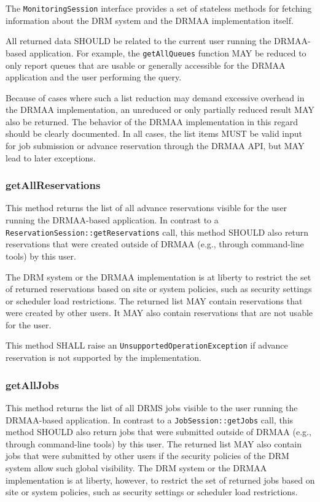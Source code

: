 \documentclass{article}
\newcommand{\h}[1]{\lstinline|#1|}
\begin{document}
The \h{MonitoringSession} interface provides a set of stateless methods for fetching information about the DRM system and the DRMAA implementation itself.



All returned data SHOULD be related to the current user running the DRMAA-based application. For example, the \h{getAllQueues} function MAY be reduced to only report queues that are usable or generally accessible for the DRMAA application and the user performing the query. 

Because of cases where such a list reduction may demand excessive overhead in the DRMAA implementation, an unreduced or only partially reduced result MAY also be returned. The behavior of the DRMAA implementation in this regard should be clearly documented. In all cases, the list items MUST be valid input for job submission or advance reservation through the DRMAA API, but MAY lead to later exceptions.

\subsubsection{getAllReservations}
\label{sec:getallreservations}

This method returns the list of all advance reservations visible for the user running the DRMAA-based application. In contrast to a \h{ReservationSession::getReservations} call, this method SHOULD also return reservations that were created outside of DRMAA (e.g., through command-line tools) by this user. 

 The DRM system or the DRMAA implementation is at liberty to restrict the set of returned reservations based on site or system policies, such as security settings or scheduler load restrictions. The returned list MAY contain reservations that were created by other users. It MAY also contain reservations that are not usable for the user.

This method SHALL raise an \h{UnsupportedOperationException} if advance reservation is not supported by the implementation.

\subsubsection{getAllJobs}

This method returns the list of all DRMS jobs visible to the user running the DRMAA-based application. In contrast to a \h{JobSession::getJobs} call, this method SHOULD also return jobs that were submitted outside of DRMAA (e.g., through command-line tools) by this user. The returned list MAY also contain jobs that were submitted by other users if the security policies of the DRM system allow such global visibility. The DRM system or the DRMAA implementation is at liberty, however, to restrict the set of returned jobs based on site or system policies, such as security settings or scheduler load restrictions.
\end{document}
